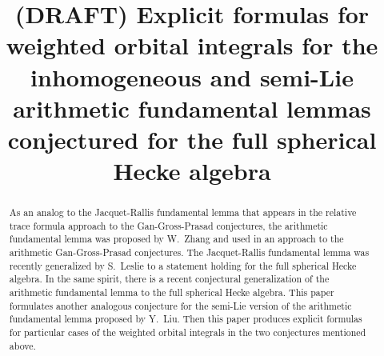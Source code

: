 \documentclass[twoside]{mitthesis}
\begin{document}
\title{(DRAFT) Explicit formulas for weighted orbital integrals for the
  inhomogeneous and semi-Lie arithmetic fundamental lemmas
  conjectured for the full spherical Hecke algebra}



\maketitle

\begin{abstract}
  As an analog to the Jacquet-Rallis fundamental lemma that appears in the
  relative trace formula approach to the Gan-Gross-Prasad conjectures,
  the arithmetic fundamental lemma was proposed by W.\ Zhang and used in an approach
  to the arithmetic Gan-Gross-Prasad conjectures.
  The Jacquet-Rallis fundamental lemma was recently generalized by S.\ Leslie
  to a statement holding for the full spherical Hecke algebra.
  In the same spirit, there is a recent conjectural generalization
  of the arithmetic fundamental lemma to the full spherical Hecke algebra.
  This paper formulates another analogous conjecture for the semi-Lie version
  of the arithmetic fundamental lemma proposed by Y.\ Liu.
  Then this paper produces explicit formulas for particular cases
  of the weighted orbital integrals in the two conjectures mentioned above.
\end{abstract}

\onehalfspacing %



\tableofcontents
\listoffigures
\listoftables


















\printbibliography[title=References,heading=bibintoc]

\appendix
\end{document}
